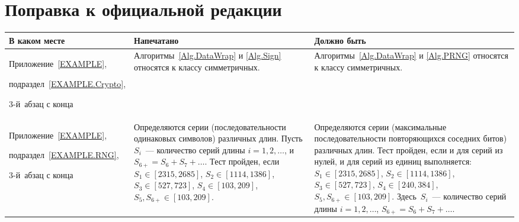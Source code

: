 \clearpage
\chapter*{\mbox{}\hfill Поправка к официальной редакции\hfill\mbox{}}

\mbox{}

\begin{center}
\begin{tabular}{|p{3.5cm}|p{6cm}|p{6cm}|}
\hline
В каком месте & Напечатано & Должно быть\\
\hline
\hline
Приложение~\ref{EXAMPLE},\par
подраздел~\ref{EXAMPLE.Crypto},\par
3-й~абзац с конца &
Алгоритмы~\ref{Alg.DataWrap} и \ref{Alg.Sign} относятся к классу 
симметричных. &
Алгоритмы~\ref{Alg.DataWrap} и \ref{Alg.PRNG} относятся к классу 
симметричных.
\\
\hline
Приложение~\ref{EXAMPLE},\par
подраздел~\ref{EXAMPLE.RNG},\par
3-й~абзац с конца &
Определяются серии (последовательности одинаковых символов) различных длин. 
Пусть $S_i$~--- количество серий длины $i=1,2,\ldots$, и $S_{6+}=S_6+S_7+\ldots$.
Тест пройден, если 
$S_1\in[2315,2685]$,
$S_2\in[1114,1386]$,
$S_3\in[527,723]$,
$S_4\in[103,209]$,
$S_5,S_{6+}\in[103,209]$.
&
Определяются серии (максимальные последовательности повторяющихся соседних 
битов) различных длин. 
Тест пройден, если и для серий из нулей, и для серий из единиц выполняется: 
$S_1\in[2315,2685]$,
$S_2\in[1114,1386]$,
$S_3\in[527,723]$,
$S_4\in[240,384]$,
$S_5,S_{6+}\in[103,209]$.
Здесь~$S_i$~--- количество серий длины $i=1,2,\ldots$, 
$S_{6+}=S_6+S_7+\ldots$.

\\
\hline
\end{tabular}
\end{center}
